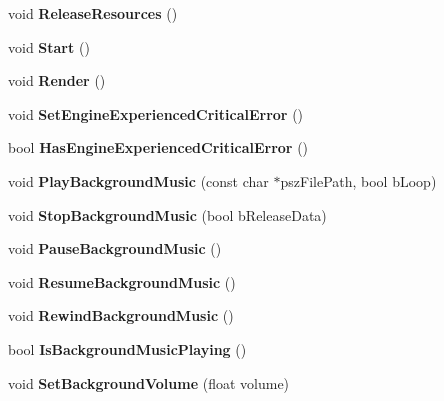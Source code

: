 \begin{DoxyCompactItemize}
void {\bfseries Release\+Resources} ()
\item 
\mbox{\label{classAudio_a545c9a12f31bc6964ac90bbf2358ada2}} 
void {\bfseries Start} ()
\item 
\mbox{\label{classAudio_a1a75c88400cddd2637f20f92ab0d7ec7}} 
void {\bfseries Render} ()
\item 
\mbox{\label{classAudio_a57349dc20c951ef8ae62694f2c9ba8a6}} 
void {\bfseries Set\+Engine\+Experienced\+Critical\+Error} ()
\item 
\mbox{\label{classAudio_a3452e0b9a18248b22d8a1af865eb213f}} 
bool {\bfseries Has\+Engine\+Experienced\+Critical\+Error} ()
\item 
\mbox{\label{classAudio_a73bed78da7257f6eef05c5c64f0b98e9}} 
void {\bfseries Play\+Background\+Music} (const char $\ast$psz\+File\+Path, bool b\+Loop)
\item 
\mbox{\label{classAudio_a2dfee6643fd471e002d9e68b4da3097d}} 
void {\bfseries Stop\+Background\+Music} (bool b\+Release\+Data)
\item 
\mbox{\label{classAudio_a4a27951873f87a8417ae384171a4a6d6}} 
void {\bfseries Pause\+Background\+Music} ()
\item 
\mbox{\label{classAudio_a00d39f6f27961933145bcbad23688309}} 
void {\bfseries Resume\+Background\+Music} ()
\item 
\mbox{\label{classAudio_a4ff36f2673e6e77df890f3e5345c8421}} 
void {\bfseries Rewind\+Background\+Music} ()
\item 
\mbox{\label{classAudio_abc3c852c177dad5d2af4bb2ee679fafe}} 
bool {\bfseries Is\+Background\+Music\+Playing} ()
\item 
\mbox{\label{classAudio_aabe66343a479443257adc77d46c39e47}} 
void {\bfseries Set\+Background\+Volume} (float volume)
\item 
\mbox{\label{classAudio_a625afba47cd1950283ffbcb5503b0aec}} 

\end{DoxyCompactItemize}

